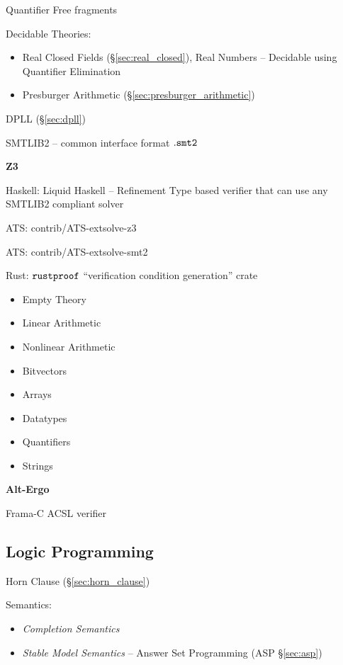 Quantifier Free fragments

Decidable Theories: %
\begin{itemize}
  \item Real Closed Fields (\S\ref{sec:real_closed}), Real Numbers --
    Decidable using Quantifier Elimination
  \item Presburger Arithmetic (\S\ref{sec:presburger_arithmetic})
\end{itemize}

DPLL (\S\ref{sec:dpll})

SMTLIB2 -- common interface format $\mathtt{.smt2}$


\textbf{Z3}

Haskell: Liquid Haskell -- Refinement Type based verifier that can use
any SMTLIB2 compliant solver

ATS: contrib/ATS-extsolve-z3

ATS: contrib/ATS-extsolve-smt2

Rust: $\mathtt{rustproof}$ ``verification condition generation'' crate

\begin{itemize}
  \item Empty Theory
  \item Linear Arithmetic
  \item Nonlinear Arithmetic
  \item Bitvectors
  \item Arrays
  \item Datatypes
  \item Quantifiers
  \item Strings
\end{itemize}


\textbf{Alt-Ergo}

Frama-C ACSL verifier



\subsection{Logic Programming}\label{sec:logic_programming}

Horn Clause (\S\ref{sec:horn_clause})

Semantics:
\begin{itemize}
  \item \emph{Completion Semantics}
  \item \emph{Stable Model Semantics} -- Answer Set Programming (ASP
    \S\ref{sec:asp})
\end{itemize}




